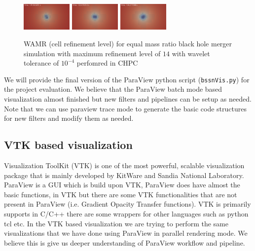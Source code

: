 \begin{figure}[H]
	\includegraphics[width=0.22\textwidth]{figs/paraview/r1/new/img_slice_level_000900.png}	
	\includegraphics[width=0.22\textwidth]{figs/paraview/r1/new/img_slice_level_001000.png}	
	\includegraphics[width=0.22\textwidth]{figs/paraview/r1/new/img_slice_level_001100.png}	
	\caption{WAMR (cell refinement level) for equal mass ratio black hole merger simulation with maximum refinement level of $14$ with wavelet tolerance of $10^{-4}$ perfomred in CHPC \label{fig:pv:r1_level}}
\end{figure}



We will provide the final version of the ParaView python script (\texttt{bssnVis.py}) for the project evaluation. We believe that the ParaView batch mode based visualization almost finished but new filters and pipelines can be setup as needed.
Note that we can use paraview trace mode to generate the basic code structures for new filters and modify them as needed. 

\subsection{VTK based visualization }
Visualization ToolKit (VTK) is one of the most powerful, scalable visualization package that is mainly developed by KitWare and Sandia National Laboratory. ParaView is a GUI which is build upon VTK, ParaView does have almost the basic functions, 
in VTK but there are some VTK functionalities that are not present in ParaView (i.e. Gradient Opacity Transfer functions). VTK is primarily supports in C/C++ there are some wrappers for other languages such as python tcl etc. In the VTK based visualization 
we are trying to perform the same visualizations that we have done using ParaView in parallel rendering mode. We believe this is give us deeper understanding of ParaView workflow and pipeline. 

